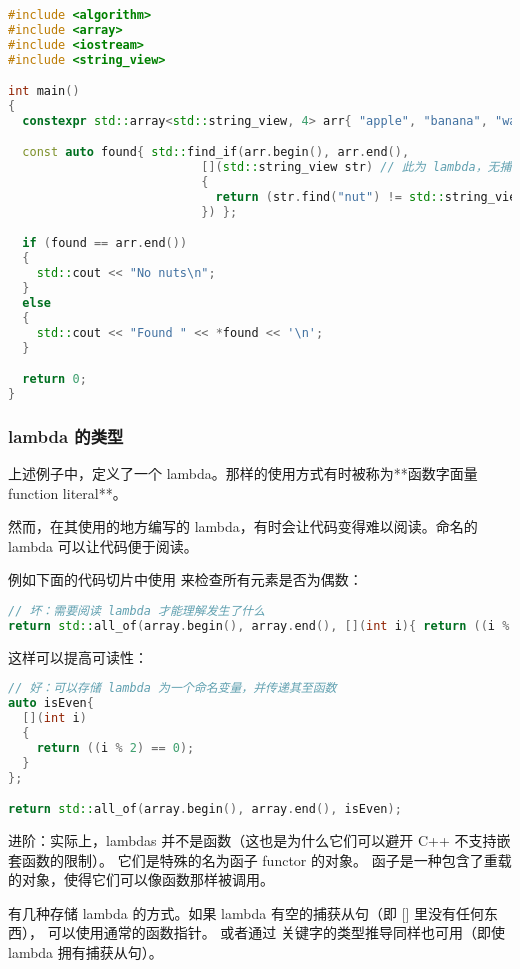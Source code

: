 \documentclass[../../LearnCpp.tex]{subfiles}
\begin{document}
\begin{lstlisting}[language=C++]
#include <algorithm>
#include <array>
#include <iostream>
#include <string_view>

int main()
{
  constexpr std::array<std::string_view, 4> arr{ "apple", "banana", "walnut", "lemon" };

  const auto found{ std::find_if(arr.begin(), arr.end(),
                           [](std::string_view str) // 此为 lambda，无捕获从句
                           {
                             return (str.find("nut") != std::string_view::npos);
                           }) };

  if (found == arr.end())
  {
    std::cout << "No nuts\n";
  }
  else
  {
    std::cout << "Found " << *found << '\n';
  }

  return 0;
}
\end{lstlisting}

\subsubsection*{lambda 的类型}

上述例子中，定义了一个 lambda。那样的使用方式有时被称为**函数字面量 function literal**。

然而，在其使用的地方编写的 lambda，有时会让代码变得难以阅读。命名的 lambda 可以让代码便于阅读。

例如下面的代码切片中使用  来检查所有元素是否为偶数：

\begin{lstlisting}[language=C++]
// 坏：需要阅读 lambda 才能理解发生了什么
return std::all_of(array.begin(), array.end(), [](int i){ return ((i % 2) == 0); });
\end{lstlisting}

这样可以提高可读性：

\begin{lstlisting}[language=C++]
// 好：可以存储 lambda 为一个命名变量，并传递其至函数
auto isEven{
  [](int i)
  {
    return ((i % 2) == 0);
  }
};

return std::all_of(array.begin(), array.end(), isEven);
\end{lstlisting}

进阶：实际上，lambdas 并不是函数（这也是为什么它们可以避开 C++ 不支持嵌套函数的限制）。
它们是特殊的名为函子 functor 的对象。
函子是一种包含了重载  的对象，使得它们可以像函数那样被调用。

有几种存储 lambda 的方式。如果 lambda 有空的捕获从句（即 [] 里没有任何东西），
可以使用通常的函数指针。 或者通过  关键字的类型推导同样也可用（即使 lambda 拥有捕获从句）。
\end{document}
